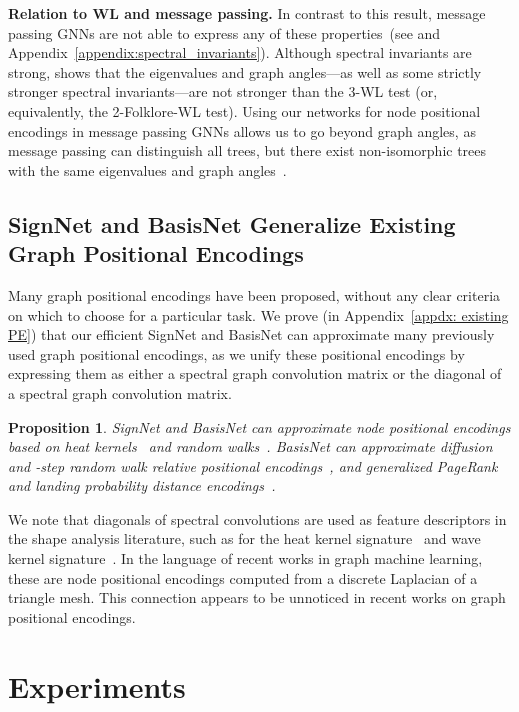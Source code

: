 \documentclass{article} \usepackage{iclr2023_conference,times}
\newtheorem{proposition}{Proposition}
\begin{document}
\textbf{Relation to WL and message passing.} In contrast to this result, message passing GNNs are not able to express any of these properties~(see \citep{arvind2020weisfeiler, garg2020} and Appendix~\ref{appendix:spectral_invariants}). Although spectral invariants are strong, \cite{furer2010power} shows that the eigenvalues and graph angles---as well as some strictly stronger spectral invariants---are not stronger than the 3-WL test (or, equivalently, the 2-Folklore-WL test). 
Using our networks for node positional encodings in  message passing GNNs allows us to go beyond graph angles, as message passing can distinguish all trees, but there exist non-isomorphic trees with the same eigenvalues and graph angles~\citep{furer2010power, cvetkovic1988constructing}.

\subsection{SignNet and BasisNet Generalize Existing Graph Positional Encodings}\label{sec:existing_pe}

Many graph positional encodings have been proposed, without any clear criteria on which to choose for a particular task. We prove (in Appendix~\ref{appdx: existing PE}) that our efficient SignNet and BasisNet can approximate many previously used graph positional encodings, as we unify these positional encodings by expressing them as either a spectral graph convolution matrix or the diagonal of a spectral graph convolution matrix.
\begin{proposition}\label{prop:approximate_positional}
    SignNet and BasisNet can approximate node positional encodings based on heat kernels~\citep{feldman2022weisfeiler} and random walks~\citep{dwivedi2022graph}. BasisNet can approximate diffusion and -step random walk relative positional encodings~\citep{mialon2021graphit}, and generalized PageRank and landing probability distance encodings~\citep{li2020distance}.
\end{proposition}
We note that diagonals of spectral convolutions are used as feature descriptors in the shape analysis literature, such as for the heat kernel signature~\citep{sun2009concise} and wave kernel signature~\citep{aubry2011wave}. In the language of recent works in graph machine learning, these are node positional encodings computed from a discrete Laplacian of a triangle mesh. This connection appears to be unnoticed in recent works on graph positional encodings.

\section{Experiments}\label{sec:experiments}
\end{document}
